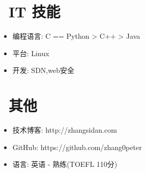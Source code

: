 \documentclass{resume}
\begin{document}
\section{\faCogs\ IT 技能}
\begin{itemize}[parsep=0.5ex]
  \item 编程语言: C == Python > C++ > Java
  \item 平台: Linux
  \item 开发: SDN,web安全
\end{itemize}




\section{\faInfo\ 其他}
\begin{itemize}[parsep=0.5ex]
  \item 技术博客: http://zhangsidan.com
  \item GitHub: https://github.com/zhang0peter
  \item 语言: 英语 - 熟练(TOEFL 110分)
\end{itemize}

%
%
\end{document}
